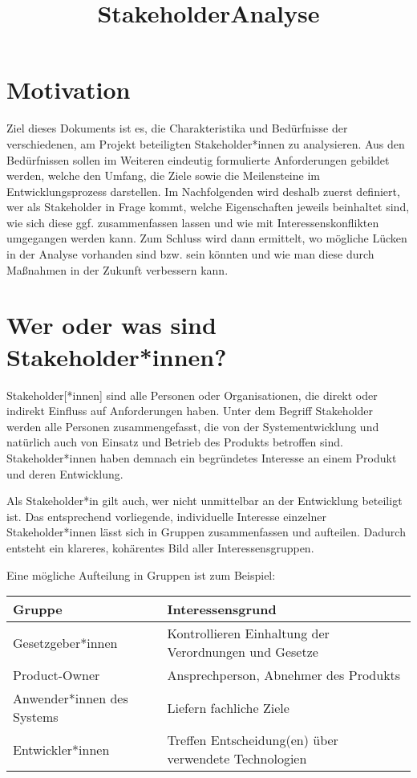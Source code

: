 \documentclass[paper=a4, parskip=half]{scrreprt}
\begin{document}
\title{StakeholderAnalyse} %




\chapter{Motivation}
Ziel dieses Dokuments ist es, die Charakteristika und Bedürfnisse der verschiedenen, am Projekt beteiligten Stakeholder*innen zu analysieren. Aus den Bedürfnissen sollen im Weiteren eindeutig formulierte Anforderungen gebildet werden, welche den Umfang, die Ziele sowie die Meilensteine im Entwicklungsprozess darstellen.
Im Nachfolgenden wird deshalb zuerst definiert, wer als Stakeholder in Frage kommt, welche Eigenschaften jeweils beinhaltet sind, wie sich diese ggf. zusammenfassen lassen und wie mit Interessenskonflikten umgegangen werden kann.
Zum Schluss wird dann ermittelt, wo mögliche Lücken in der Analyse vorhanden sind bzw. sein könnten und wie man diese durch Maßnahmen in der Zukunft verbessern kann.

\chapter{Wer oder was sind Stakeholder*innen?}
Stakeholder[*innen] sind alle Personen oder Organisationen, die direkt oder indirekt Einfluss auf Anforderungen haben.
Unter dem Begriff Stakeholder werden alle Personen zusammengefasst, die von der Systementwicklung  und  natürlich  auch  von  Einsatz  und  Betrieb  des  Produkts  betroffen  sind.
Stakeholder*innen haben demnach ein begründetes Interesse an einem Produkt und deren Entwicklung.

Als Stakeholder*in gilt auch, wer nicht unmittelbar an der Entwicklung beteiligt ist. Das entsprechend vorliegende, individuelle Interesse einzelner Stakeholder*innen lässt sich in Gruppen zusammenfassen und aufteilen. Dadurch entsteht ein klareres, kohärentes Bild aller Interessensgruppen.

\vspace{0.5cm}
Eine mögliche Aufteilung in Gruppen ist zum Beispiel:

\begin{tabular}[h]{l|l}
    \textbf{Gruppe} & \textbf{Interessensgrund} \\
    \hline
    Gesetzgeber*innen & Kontrollieren Einhaltung der Verordnungen und Gesetze\\
    \hline
    Product-Owner & Ansprechperson, Abnehmer des Produkts\\
    \hline
    Anwender*innen des Systems & Liefern fachliche Ziele\\
    \hline
	Entwickler*innen &  Treffen Entscheidung(en) über verwendete Technologien\\

\end{tabular}
\end{document}
